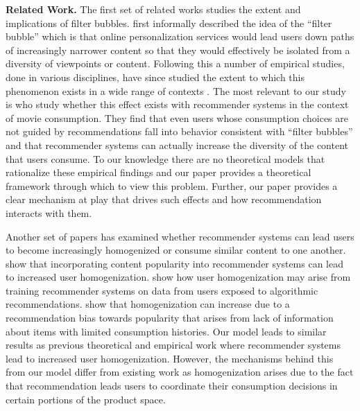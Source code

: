 \documentclass[format=acmsmall, review=false]{acmart}
\begin{document}
\textbf{Related Work.} 
The first set of related works studies the extent and implications of filter bubbles. \cite{pariser2011filter} first informally described the idea of the ``filter bubble'' which is that online personalization services would lead users down paths of increasingly narrower content so that they would effectively be isolated from a diversity of viewpoints or content. Following this a number of empirical studies, done in various disciplines, have since studied the extent to which this phenomenon exists in a wide range of contexts \cite{flaxman2016filter,hosanagar2013will,moller2018blame,nguyen2014exploring}. The most relevant to our study is \cite{nguyen2014exploring} who study whether this effect exists with recommender systems in the context of movie consumption. They find that even users whose consumption choices are not guided by recommendations fall into behavior consistent with ``filter bubbles'' and that recommender systems can actually increase the diversity of the content that users consume. To our knowledge there are no theoretical models that rationalize these empirical findings and our paper provides a theoretical framework through which to view this problem. Further, our paper provides a clear mechanism at play that drives such effects and how recommendation interacts with them.
\par 
Another set of papers has examined whether recommender systems can lead users to become increasingly homogenized or consume similar content to one another. \cite{celma2008hits, treviranus2009value} show that incorporating content popularity into recommender systems can lead to increased user homogenization. \cite{chaney2018algorithmic} show how user homogenization may arise from training recommender systems on data from users exposed to algorithmic recommendations. \cite{fleder2009blockbuster} show that homogenization can increase due to a recommendation bias towards popularity that arises from lack of information about items with limited consumption histories. Our model leads to similar results as previous theoretical and empirical work where recommender systems lead to increased user homogenization. However, the mechanisms behind this from our model differ from existing work as homogenization arises due to the fact that recommendation leads users to coordinate their consumption decisions in certain portions of the product space.
\par
\end{document}
